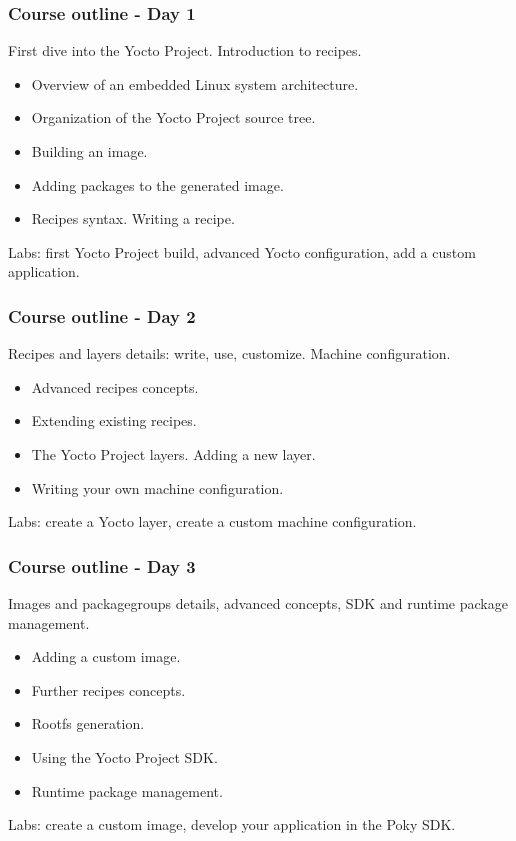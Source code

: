 \begin{frame}
\frametitle{Course outline - Day 1}
First dive into the Yocto Project. Introduction to recipes.
\begin{itemize}
\item Overview of an embedded Linux system architecture.
\item Organization of the Yocto Project source tree.
\item Building an image.
\item Adding packages to the generated image.
\item Recipes syntax. Writing a recipe.
\end{itemize}
Labs: first Yocto Project build, advanced Yocto configuration,
add a custom application.
\end{frame}

\begin{frame}
\frametitle{Course outline - Day 2}
Recipes and layers details: write, use, customize. Machine
configuration.
\begin{itemize}
\item Advanced recipes concepts.
\item Extending existing recipes.
\item The Yocto Project layers. Adding a new layer.
\item Writing your own machine configuration.
\end{itemize}
Labs: create a Yocto layer, create a custom machine configuration.
\end{frame}

\begin{frame}
\frametitle{Course outline - Day 3}
Images and packagegroups details, advanced concepts, SDK and
runtime package management.
\begin{itemize}
\item Adding a custom image.
\item Further recipes concepts.
\item Rootfs generation.
\item Using the Yocto Project SDK.
\item Runtime package management.
\end{itemize}
Labs: create a custom image, develop your application in
the Poky SDK.
\end{frame}
